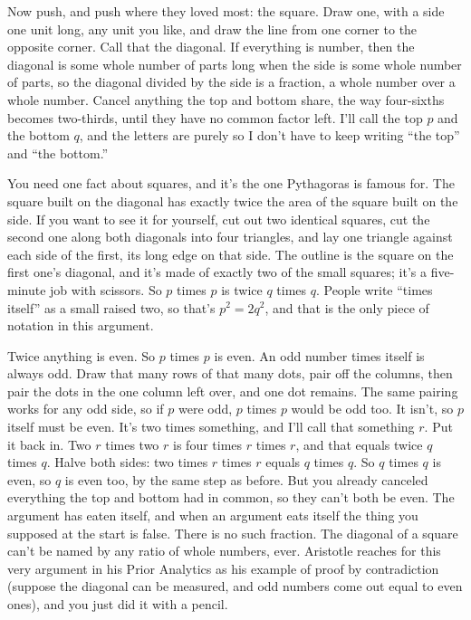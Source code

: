 \documentclass[11pt,twoside]{article}
\theoremstyle{thielethm}
\theoremstyle{thieledef}
\theoremstyle{thieledef}
\theoremstyle{thieledef}
\theoremstyle{thielethm}
\theoremstyle{thieleobs}
\theoremstyle{thielethm}
\begin{document}
Now push, and push where they loved most: the square. Draw one, with a side one unit long, any unit you like, and draw the line from one corner to the opposite corner. Call that the diagonal. If everything is number, then the diagonal is some whole number of parts long when the side is some whole number of parts, so the diagonal divided by the side is a fraction, a whole number over a whole number. Cancel anything the top and bottom share, the way four-sixths becomes two-thirds, until they have no common factor left. I'll call the top $p$ and the bottom $q$, and the letters are purely so I don't have to keep writing ``the top'' and ``the bottom.''

You need one fact about squares, and it's the one Pythagoras is famous for. The square built on the diagonal has exactly twice the area of the square built on the side. If you want to see it for yourself, cut out two identical squares, cut the second one along both diagonals into four triangles, and lay one triangle against each side of the first, its long edge on that side. The outline is the square on the first one's diagonal, and it's made of exactly two of the small squares; it's a five-minute job with scissors. So $p$ times $p$ is twice $q$ times $q$. People write ``times itself'' as a small raised two, so that's $p^2 = 2q^2$, and that is the only piece of notation in this argument.

Twice anything is even. So $p$ times $p$ is even. An odd number times itself is always odd. Draw that many rows of that many dots, pair off the columns, then pair the dots in the one column left over, and one dot remains. The same pairing works for any odd side, so if $p$ were odd, $p$ times $p$ would be odd too. It isn't, so $p$ itself must be even. It's two times something, and I'll call that something $r$. Put it back in. Two $r$ times two $r$ is four times $r$ times $r$, and that equals twice $q$ times $q$. Halve both sides: two times $r$ times $r$ equals $q$ times $q$. So $q$ times $q$ is even, so $q$ is even too, by the same step as before. But you already canceled everything the top and bottom had in common, so they can't both be even. The argument has eaten itself, and when an argument eats itself the thing you supposed at the start is false. There is no such fraction. The diagonal of a square can't be named by any ratio of whole numbers, ever. Aristotle reaches for this very argument in his Prior Analytics as his example of proof by contradiction (suppose the diagonal can be measured, and odd numbers come out equal to even ones), and you just did it with a pencil.
\end{document}
